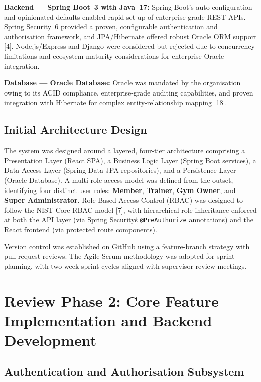 \documentclass[
  12pt,
  a4paperpaper,
]{report}
\begin{document}
\textbf{Backend --- Spring Boot~3 with Java~17:} Spring Boot's
auto-configuration and opinionated defaults enabled rapid set-up of
enterprise-grade REST APIs. Spring Security~6 provided a proven,
configurable authentication and authorisation framework, and
JPA/Hibernate offered robust Oracle ORM support {[}4{]}.
Node.js/Express and Django were considered but rejected due to
concurrency limitations and ecosystem maturity considerations for
enterprise Oracle integration.

\textbf{Database --- Oracle Database:} Oracle was mandated by the
organisation owing to its ACID compliance, enterprise-grade auditing
capabilities, and proven integration with Hibernate for complex
entity-relationship mapping {[}18{]}.

\subsection{Initial Architecture Design}\label{initial-architecture-design}

The system was designed around a layered, four-tier architecture
comprising a Presentation Layer (React SPA), a Business Logic Layer
(Spring Boot services), a Data Access Layer (Spring Data JPA
repositories), and a Persistence Layer (Oracle Database). A
multi-role access model was defined from the outset, identifying four
distinct user roles: \textbf{Member}, \textbf{Trainer},
\textbf{Gym Owner}, and \textbf{Super Administrator}. Role-Based
Access Control (RBAC) was designed to follow the NIST Core RBAC
model {[}7{]}, with hierarchical role inheritance
enforced at both the API layer (via Spring Security\'s
\texttt{@PreAuthorize} annotations) and the React frontend (via
protected route components).

Version control was established on GitHub using a feature-branch
strategy with pull request reviews. The Agile Scrum methodology was
adopted for sprint planning, with two-week sprint cycles aligned
with supervisor review meetings.


\section{Review Phase 2: Core Feature Implementation and Backend
Development}\label{review-phase-2}

\subsection{Authentication and Authorisation
Subsystem}\label{authentication-subsystem}
\end{document}
